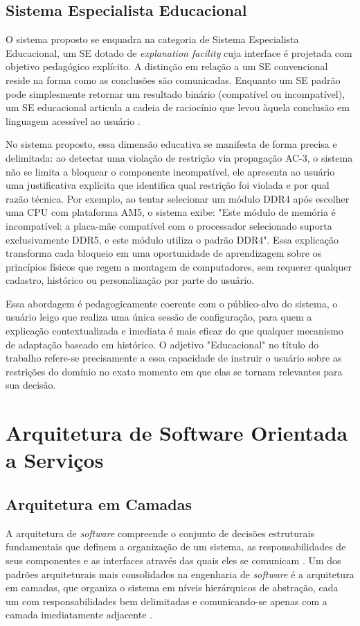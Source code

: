 \subsection{Sistema Especialista Educacional}
O sistema proposto se enquadra na categoria de Sistema Especialista Educacional, um SE dotado de \textit{explanation facility}
cuja interface é projetada com objetivo pedagógico explícito. A distinção em relação a um SE convencional reside na forma como
as conclusões são comunicadas. Enquanto um SE padrão pode simplesmente retornar um resultado binário (compatível ou incompatível),
um SE educacional articula a cadeia de raciocínio que levou àquela conclusão em linguagem acessível ao usuário \cite{Clancey1983}.

No sistema proposto, essa dimensão educativa se manifesta de forma precisa e delimitada: ao detectar uma violação de restrição
via propagação AC-3, o sistema não se limita a bloquear o componente incompatível, ele apresenta ao usuário uma justificativa explícita
que identifica qual restrição foi violada e por qual razão técnica. Por exemplo, ao tentar selecionar um módulo DDR4 após escolher
uma CPU com plataforma AM5, o sistema exibe: "Este módulo de memória é incompatível: a placa-mãe compatível com o processador selecionado
suporta exclusivamente DDR5, e este módulo utiliza o padrão DDR4". Essa explicação transforma cada bloqueio em uma oportunidade de
aprendizagem sobre os princípios físicos que regem a montagem de computadores, sem requerer qualquer cadastro, histórico ou personalização
por parte do usuário.

Essa abordagem é pedagogicamente coerente com o público-alvo do sistema, o usuário leigo que realiza uma única sessão de configuração,
para quem a explicação contextualizada e imediata é mais eficaz do que qualquer mecanismo de adaptação baseado em histórico. O adjetivo
"Educacional" no título do trabalho refere-se precisamente a essa capacidade de instruir o usuário sobre as restrições do domínio no exato
momento em que elas se tornam relevantes para sua decisão.

\section{Arquitetura de Software Orientada a Serviços}
\label{sec:arquitetura-software}

\subsection{Arquitetura em Camadas}
A arquitetura de \textit{software} compreende o conjunto de decisões estruturais fundamentais que definem a organização
de um sistema, as responsabilidades de seus componentes e as interfaces através das quais eles se comunicam \cite{Fowler2002}.
Um dos padrões arquiteturais mais consolidados na engenharia de \textit{software} é a arquitetura em camadas, que organiza
o sistema em níveis hierárquicos de abstração, cada um com responsabilidades bem delimitadas e comunicando-se apenas com
a camada imediatamente adjacente \cite{Fowler2002}.

